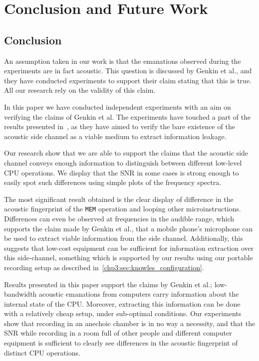 \chapter{Conclusion and Future Work}\label{chp7:conclusion}

\section{Conclusion}

An assumption taken in our work is that the emanations observed during the experiments are in fact acoustic.
This question is discussed by Genkin et al., and they have conducted experiments to support their claim stating that this is true.
All our research rely on the validity of this claim.

In this paper we have conducted independent experiments with an aim on verifying the claims of Genkin et al. 
The experiments have touched a part of the results presented in~\cite{DBLP:conf/crypto/GenkinST14}, as they have aimed to verify the bare existence of the acoustic side channel as a viable medium to extract information leakage.

Our research show that we are able to support the claims that the acoustic side channel conveys enough information to distinguish between different low-level \gls{CPU} operations.
We display that the \gls{SNR} in some cases is strong enough to easily spot such differences using simple plots of the frequency spectra.

The most significant result obtained is the clear display of difference in the acoustic fingerprint of the \texttt{MEM} operation and looping other microinstructions.
Differences can even be observed at frequencies in the audible range, which supports the claim made by Genkin et al., that a mobile phone's microphone can be used to extract viable information from the side channel.
Additionally, this suggests that low-cost equipment can be sufficient for information extraction over this side-channel, something which is supported by our results using our portable recording setup as described in~\autoref{chp3:sec:knowles_configuration}.

Results presented in this paper support the claims by Genkin et al.; low-bandwidth acoustic emanations from computers carry information about the internal state of the \gls{CPU}.
Moreover, extracting this information can be done with a relatively cheap setup, under sub-optimal conditions.
Our experiments show that recording in an anechoic chamber is in no way a necessity, and that the \gls{SNR} while recording in a room full of other people and different computer equipment is sufficient to clearly see differences in the acoustic fingerprint of distinct \gls{CPU} operations.

